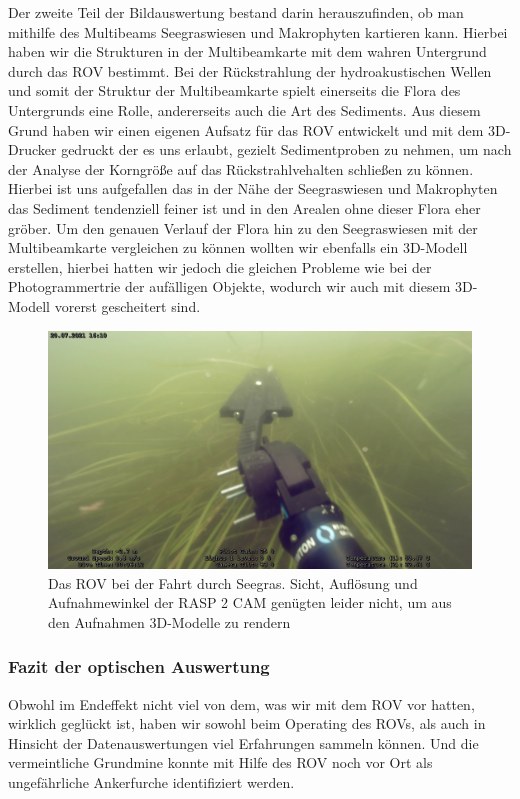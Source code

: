 Der zweite Teil der Bildauswertung bestand darin herauszufinden, ob man mithilfe des Multibeams Seegraswiesen und Makrophyten kartieren kann. Hierbei haben wir die Strukturen in der Multibeamkarte mit dem wahren Untergrund durch das ROV bestimmt.
Bei der Rückstrahlung der hydroakustischen Wellen und somit der Struktur der Multibeamkarte spielt einerseits die Flora des Untergrunds eine Rolle, andererseits auch die Art des Sediments.
Aus diesem Grund haben wir einen eigenen Aufsatz für das ROV entwickelt und mit dem 3D-Drucker gedruckt der es uns erlaubt, gezielt Sedimentproben zu nehmen, um nach der Analyse der Korngröße auf das Rückstrahlvehalten schließen zu können.
Hierbei ist uns aufgefallen das in der Nähe der Seegraswiesen und Makrophyten das Sediment tendenziell feiner ist und in den Arealen ohne dieser Flora eher gröber.
Um den genauen Verlauf der Flora hin zu den Seegraswiesen mit der Multibeamkarte vergleichen zu können wollten wir ebenfalls ein 3D-Modell erstellen, hierbei hatten wir jedoch die gleichen Probleme wie bei der Photogrammertrie der aufälligen Objekte, wodurch wir auch mit diesem 3D-Modell vorerst gescheitert sind.
\begin{figure}[htb]
\includegraphics[height=\textheight,%
                   width=\textwidth,%
                   keepaspectratio]{Bilder/ROV/Seegras.png}
\caption{Das ROV bei der Fahrt durch Seegras. Sicht, Auflösung und Aufnahmewinkel der RASP 2 CAM genügten leider nicht, um aus den Aufnahmen 3D-Modelle zu rendern}
\end{figure}


\subsubsection{Fazit der optischen Auswertung}
Obwohl im Endeffekt nicht viel von dem, was wir mit dem ROV vor hatten, wirklich geglückt ist, haben wir sowohl beim Operating des ROVs, als auch in Hinsicht der Datenauswertungen viel Erfahrungen sammeln können. Und die vermeintliche Grundmine konnte mit Hilfe des ROV noch vor Ort als ungefährliche Ankerfurche identifiziert werden.




